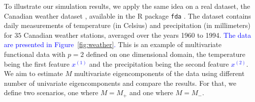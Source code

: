 To illustrate our simulation results, we apply the same idea on a real dataset, the Canadian weather dataset \citep{ramsayFunctionalDataAnalysis2005}, available in the \textsf{R} package \texttt{fda} \citep{ramsayFdaFunctionalData2023}. The dataset contains daily measurements of temperature (in Celsius) and precipitation (in millimeters) for $35$ Canadian weather stations, averaged over the years 1960 to 1994. \textcolor{blue}{The data are presented in Figure~\ref{fig:weather}.} This is an example of multivariate functional data with $p = 2$ defined on one dimensional domain, the temperature being the first feature \textcolor{blue}{$x^{(1)}$} and the precipitation being the second feature \textcolor{blue}{$x^{(2)}$}. We aim to estimate $M$ multivariate eigencomponents of the data using different number of univariate eigencomponents and compare the results. For that, we define two scenarios, one where $M = M_{+}$ and one where $M = M_{-}$.
